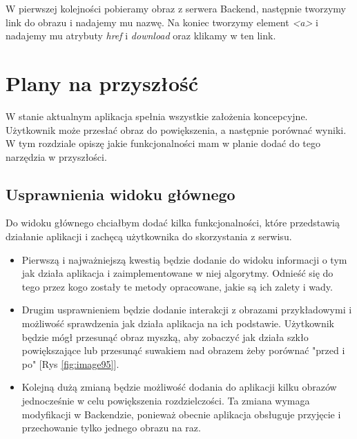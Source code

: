 W pierwszej kolejności pobieramy obraz z serwera Backend, następnie tworzymy link do obrazu i nadajemy mu nazwę. Na koniec tworzymy element \textit{<a>} i nadajemy mu atrybuty \textit{href} i \textit{download} oraz klikamy w ten link.


\section{Plany na przyszłość} \label{sec:plans}

W stanie aktualnym aplikacja spełnia wszystkie założenia koncepcyjne. Użytkownik może przesłać obraz do powiększenia, a następnie porównać wyniki. W tym rozdziale opiszę jakie funkcjonalności mam w planie dodać do tego narzędzia w przyszłości.

\subsection*{Usprawnienia widoku głównego}

Do widoku głównego chciałbym dodać kilka funkcjonalności, które przedstawią działanie aplikacji i zachęcą użytkownika do skorzystania z serwisu.

\begin{itemize}
    \item Pierwszą i najważniejszą kwestią będzie dodanie do widoku informacji o tym jak działa aplikacja i zaimplementowane w niej algorytmy. Odnieść się do tego przez kogo zostały te metody opracowane, jakie są ich zalety i wady.
    \item Drugim usprawnieniem będzie dodanie interakcji z obrazami przykładowymi i możliwość sprawdzenia jak działa aplikacja na ich podstawie. Użytkownik będzie mógł przesunąć obraz myszką, aby zobaczyć jak działa szkło powiększające lub przesunąć suwakiem nad obrazem żeby porównać "przed i po" [Rys \ref{fig:image95}].
    \item Kolejną dużą zmianą będzie możliwość dodania do aplikacji kilku obrazów jednocześnie w celu powiększenia rozdzielczości. Ta zmiana wymaga modyfikacji w Backendzie, ponieważ obecnie aplikacja obsługuje przyjęcie i przechowanie tylko jednego obrazu na raz.
\end{itemize}


